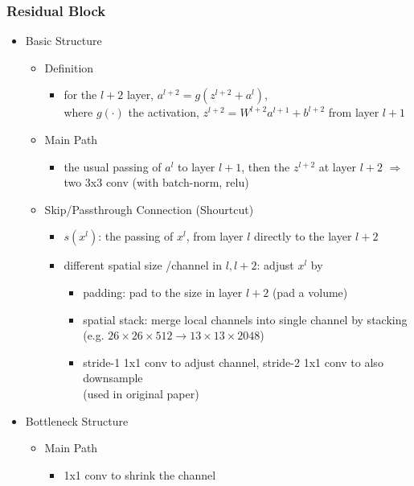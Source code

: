 \subsubsection{Residual Block} \label{DL_Block_Res}
\begin{itemize}
\item Basic Structure
	\begin{itemize}
	\item Definition
		\begin{itemize}
		\item for the $l+2$ layer, $a^{l+2} = g(z^{l+2} + a^l)$, \\
		where $g(\cdot)$ the activation, $z^{l+2} = W^{l+2}a^{l+1}+b^{l+2}$ from layer $l+1$ 
		\end{itemize}
	\item Main Path
		\begin{itemize}
		\item the usual passing of $a^l$ to layer $l+1$, then the $z^{l+2}$ at layer $l+2$
		$\Rightarrow$ two 3x3 conv (with batch-norm, relu)
		\end{itemize}
	\item Skip/Passthrough Connection (Shourtcut) \label{DL_Block_Res_Passthrough}
		\begin{itemize}
		\item $s(x^l)$: the passing of $x^{l}$, from layer $l$ directly to the layer $l+2$
		\item different spatial size /channel in $l, {l+2}$: adjust $x^l$ by
			\begin{itemize}
			\item padding: pad to the size in layer ${l+2}$ (pad a volume)
			\item spatial stack: merge local channels into single channel by stacking \\
			(e.g. $26\times26\times512\rightarrow13\times13\times2048$)
			\item stride-1 1x1 conv to adjust channel, stride-2 1x1 conv to also downsample \\
			(used in original paper)
			\end{itemize}
		\end{itemize}
	\end{itemize}
\item Bottleneck Structure
	\begin{itemize}
	\item Main Path
		\begin{itemize}
		\item 1x1 conv to shrink the channel

\end{itemize}
\end{itemize}
\end{itemize}
